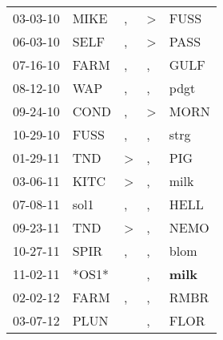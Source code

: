 \begin{supertabular}{p{0.07\textwidth}p{0.06\textwidth}p{0.02\textwidth}p{0.02\textwidth}p{0.06\textwidth}}
          03-03-10\textsuperscript{} &           MIKE\textsuperscript{} &                , &     \textgreater &           FUSS\textsuperscript{} \\
          06-03-10\textsuperscript{} &           SELF\textsuperscript{} &                , &     \textgreater &           PASS\textsuperscript{} \\
          07-16-10\textsuperscript{} &           FARM\textsuperscript{} &                , &                , &           GULF\textsuperscript{} \\
          08-12-10\textsuperscript{} &            WAP\textsuperscript{} &                , &                , &           pdgt\textsuperscript{} \\
          09-24-10\textsuperscript{} &           COND\textsuperscript{} &                , &     \textgreater &           MORN\textsuperscript{} \\
          10-29-10\textsuperscript{} &           FUSS\textsuperscript{} &                , &                , &           strg\textsuperscript{} \\
          01-29-11\textsuperscript{} &            TND\textsuperscript{} &     \textgreater &                , &            PIG\textsuperscript{} \\
          03-06-11\textsuperscript{} &           KITC\textsuperscript{} &     \textgreater &                , &           milk\textsuperscript{} \\
          07-08-11\textsuperscript{} &           sol1\textsuperscript{} &                , &                , &           HELL\textsuperscript{} \\
          09-23-11\textsuperscript{} &            TND\textsuperscript{} &     \textgreater &                , &           NEMO\textsuperscript{} \\
          10-27-11\textsuperscript{} &           SPIR\textsuperscript{} &                , &                , &           blom\textsuperscript{} \\
          11-02-11\textsuperscript{} &                            *OS1* &                  &                , &  \textbf{milk\textsuperscript{}} \\
          02-02-12\textsuperscript{} &           FARM\textsuperscript{} &                , &                , &           RMBR\textsuperscript{} \\
          03-07-12\textsuperscript{} &           PLUN\textsuperscript{} &                  &                , &           FLOR\textsuperscript{} \\

\end{supertabular}
